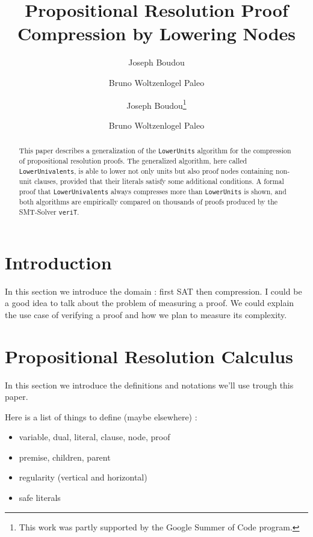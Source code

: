 \documentclass{llncs}
\title{Propositional Resolution Proof Compression by Lowering Nodes}
\author{Joseph Boudou \and Bruno Woltzenlogel Paleo}
\institute{Vienna University of Technology, Austria}
\author{
  Joseph Boudou\inst{1}\thanks{This work was partly supported by the Google Summer of Code program.}
  \and 
  Bruno Woltzenlogel Paleo\inst{2}
}
\institute{
  University of Toulouse (TODO) \\
  \email{jogo@matabio.net}
  \and 
  Vienna University of Technology \\
  \email{bruno@logic.at}
}
\newenvironment{jogo}{\color{teal}}{}
\newcommand{\LowerUnits}{\texttt{LowerUnits}}
\newcommand{\LowerUnivalents}{\texttt{LowerUnivalents}}
\newcommand{\VeriT}{\texttt{veriT}}
\begin{document}
\maketitle


\begin{abstract}
This paper describes a generalization of the {\LowerUnits} algorithm \cite{ToDo} for the compression of propositional resolution proofs. The generalized algorithm, here called {\LowerUnivalents}, is able to lower not only units but also proof nodes containing non-unit clauses, provided that their literals satisfy some additional conditions. A formal proof that {\LowerUnivalents} always compresses more than {\LowerUnits} is shown, and both algorithms are empirically compared on thousands of proofs produced by the SMT-Solver {\VeriT}.
\end{abstract}

\section{Introduction}

\begin{jogo}
In this section we introduce the domain : first SAT then compression.
I could be a good idea to talk about the problem of measuring a proof.
We could explain the use case of verifying a proof and how we plan to measure its complexity.
\end{jogo}

\section{Propositional Resolution Calculus}

\begin{jogo}
In this section we introduce the definitions and notations we'll use trough this paper.

Here is a list of things to define (maybe elsewhere) : \begin{itemize}%
    \item variable, dual, literal, clause, node, proof
    \item premise, children, parent
    \item regularity (vertical and horizontal)
    \item safe literals
\end{itemize}
\end{jogo}
\end{document}
